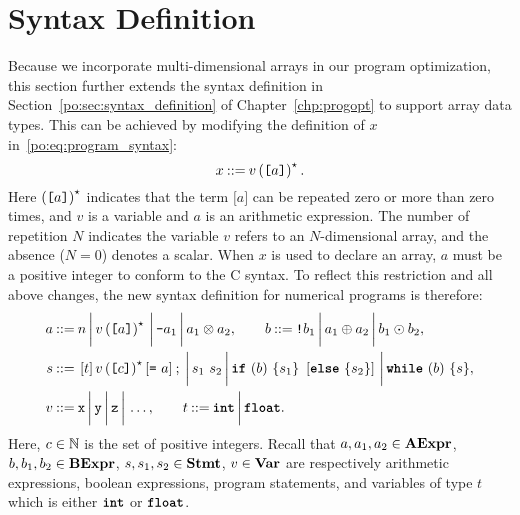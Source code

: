 \section{Syntax Definition}
\label{lo:sec:syntax_definition}

Because we incorporate multi-dimensional arrays in our program
optimization, this section further extends the syntax definition in
Section~\ref{po:sec:syntax_definition} of Chapter~\ref{chp:progopt} to support
array data types.  This can be achieved by modifying the definition of $x$
in~\eqref{po:eq:program_syntax}:
\begin{equation}
    x \mathbin{::=} v \left( \texttt{[$a$]} \right)^\star.
\end{equation}
Here $\left( \texttt{[$a$]} \right)^\star$ indicates that the term $\texttt{[} a
\texttt{]}$ can be repeated zero or more than zero times, and $v$ is a variable
and $a$ is an arithmetic expression.  The number of repetition $N$ indicates
the variable $v$ refers to an $N$-dimensional array, and the absence ($N = 0$)
denotes a scalar.  When $x$ is used to declare an array, $a$ must be a positive
integer to conform to the C syntax.  To reflect this restriction and all above
changes, the new syntax definition for numerical programs is therefore:
\begin{equation}
    \begin{aligned}
        a \mathbin{::=} {} &
            n \,\bigg|\,
            v \left( \texttt{[$a$]} \right)^\star \,\bigg|\,
            \texttt{-}a_1 \,\bigg|\,
            a_1 \otimes a_2, \qquad
        b \mathbin{::=}
            \texttt{!}b_1 \,\bigg|\,
            a_1 \oplus a_2 \,\bigg|\,
            b_1 \odot b_2, \\
        s \mathbin{::=} {} &
            \left[ t \right] v \left( \texttt{[$c$]} \right)^\star
                \left[ \texttt{=}~a \right] \mathbin{;} \,\bigg|\,
            s_1~s_2 \,\bigg|\,
            \texttt{\textbf{if}}~(b)~\{ s_1 \}~\left[\texttt{\textbf{else}}~\{ s_2 \}\right] \,\bigg|\,
            \texttt{\textbf{while}}~(b)~\{s\}, \\
        v \mathbin{::=} {} & \texttt{x} \,\bigg|\, \texttt{y} \,\bigg|\, \texttt{z} \,\bigg|\, \mathellipsis,
            \qquad
        t \mathbin{::=} \texttt{\textbf{int}} \,\bigg|\, \texttt{\textbf{float}}.
    \end{aligned}
    \label{lo:eq:program_syntax}
\end{equation}
Here, $c \in \mathbb{N}$ is the set of positive integers.  Recall that
$a, a_1, a_2 \in \mathbf{AExpr}$, $b, b_1, b_2 \in \mathbf{BExpr}$, $s, s_1, s_2 \in
\mathbf{Stmt}$, $v \in \mathbf{Var}$ are respectively arithmetic expressions, boolean
expressions, program statements, and variables of type $t$ which is either
$\texttt{\textbf{int}}$ or $\texttt{\textbf{float}}$.
